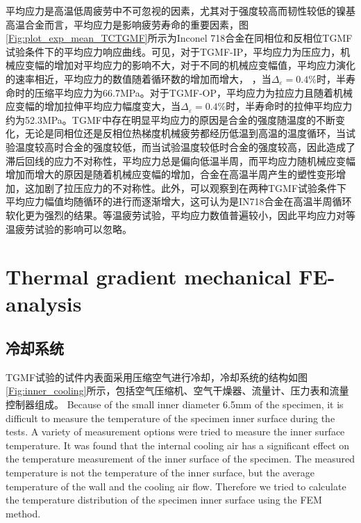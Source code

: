 \documentclass{article}
\begin{document}
平均应力是高温低周疲劳中不可忽视的因素，尤其对于强度较高而韧性较低的镍基高温合金而言，平均应力是影响疲劳寿命的重要因素，图\ref{Fig:plot_exp_mean_TCTGMF}所示为Inconel 718合金在同相位和反相位TGMF试验条件下的平均应力响应曲线。可见，对于TGMF-IP，平均应力为压应力，机械应变幅的增加对平均应力的影响不大，对于不同的机械应变幅值，平均应力演化的速率相近，平均应力的数值随着循环数的增加而增大，
，当$\Delta_{\varepsilon}=0.4\%$时，半寿命时的压缩平均应力为66.7MPa。对于TGMF-OP，平均应力为拉应力且随着机械应变幅的增加拉伸平均应力幅度变大，当$\Delta_{\varepsilon}=0.4\%$时，半寿命时的拉伸平均应力约为52.3MPa。TGMF中存在明显平均应力的原因是合金的强度随温度的不断变化，无论是同相位还是反相位热梯度机械疲劳都经历低温到高温的温度循环，当试验温度较高时合金的强度较低，而当试验温度较低时合金的强度较高，因此造成了滞后回线的应力不对称性，平均应力总是偏向低温半周，而平均应力随机械应变幅增加而增大的原因是随着机械应变幅的增加，合金在高温半周产生的塑性变形增加，这加剧了拉压应力的不对称性。此外，可以观察到在两种TGMF试验条件下平均应力幅值均随循环的进行而逐渐增大，这可认为是IN718合金在高温半周循环软化更为强烈的结果。等温疲劳试验，平均应力数值普遍较小，因此平均应力对等温疲劳试验的影响可以忽略。


\section{Thermal gradient mechanical FE-analysis}

\subsection{冷却系统}


TGMF试验的试件内表面采用压缩空气进行冷却，冷却系统的结构如图\ref{Fig:inner_cooling}所示，包括空气压缩机、空气干燥器、流量计、压力表和流量控制器组成。
Because of the small inner diameter 6.5mm of the specimen, it is difficult to measure the temperature of the specimen inner surface during the tests.
A variety of measurement options were tried to measure the inner surface temperature.
It was found that the internal cooling air has a significant effect on the temperature measurement of the inner surface of the specimen.
The measured temperature is not the temperature of the inner surface, but the average temperature of the wall and the cooling air flow.
Therefore we tried to calculate the temperature distribution of the specimen inner surface using the FEM method.
\end{document}
